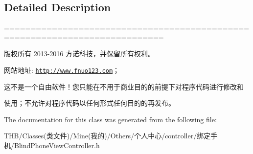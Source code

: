 \subsection{Detailed Description}
============================================================================

版权所有 2013-\/2016 方诺科技，并保留所有权利。

网站地址\+: \href{http://www.fnuo123.com}{\tt http\+://www.\+fnuo123.\+com}； 



这不是一个自由软件！您只能在不用于商业目的的前提下对程序代码进行修改和

使用；不允许对程序代码以任何形式任何目的的再发布。 

 

The documentation for this class was generated from the following file\+:\begin{DoxyCompactItemize}
\item 
T\+H\+B/\+Classes(类文件)/\+Mine(我的)/\+Others/个人中心/controller/绑定手机/Blind\+Phone\+View\+Controller.\+h\end{DoxyCompactItemize}
